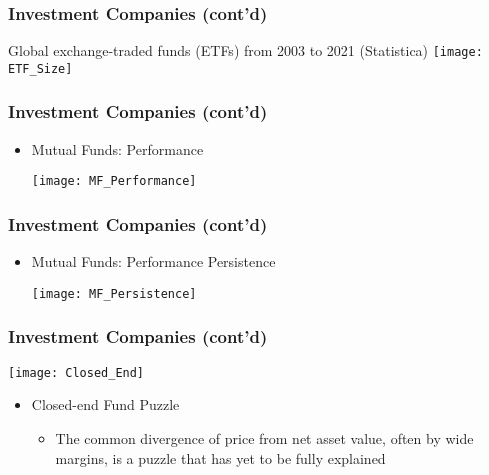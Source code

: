 \documentclass[10pt]{beamer}
\begin{document}
	
	\begin{frame}
		\frametitle{Investment Companies (cont'd)}
		
		
		\begin{center}
			Global exchange-traded funds (ETFs) from 2003 to 2021 (Statistica)
			\texttt{[image: ETF\_Size]}
		\end{center}
	\end{frame}
	
	
	
	\begin{frame}
		\frametitle{Investment Companies (cont'd)}
		
		\begin{itemize} 
			\item Mutual Funds: Performance 		\\
			\begin{center}
				\texttt{[image: MF\_Performance]}
			\end{center}
			
		\end{itemize}
		
	\end{frame}
	
	
	
	\begin{frame}
		\frametitle{Investment Companies (cont'd)}
		
		\begin{itemize} 
			\item Mutual Funds: Performance Persistence		\\
			\begin{center}
				\texttt{[image: MF\_Persistence]}
			\end{center}
			
		\end{itemize}
		
	\end{frame}
	
	
	
	\begin{frame}
		\frametitle{Investment Companies (cont'd)}
		
		\begin{center}
			\texttt{[image: Closed\_End]}
		\end{center}
		
		\begin{itemize} 
			\item Closed-end Fund Puzzle
			
			\begin{itemize}
				\item The common divergence of price from net asset value, often by wide margins, is a puzzle that has yet to be fully explained
				
			\end{itemize}
			
		\end{itemize}
		
	\end{frame}
	
\end{document}
